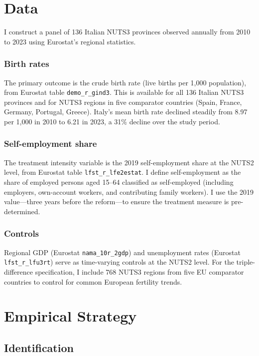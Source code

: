 \documentclass[12pt]{article}
\begin{document}
\section{Data}

I construct a panel of 136 Italian NUTS3 provinces observed annually from 2010 to 2023 using Eurostat's regional statistics.

\subsubsection*{Birth rates} The primary outcome is the crude birth rate (live births per 1,000 population), from Eurostat table \texttt{demo\_r\_gind3}. This is available for all 136 Italian NUTS3 provinces and for NUTS3 regions in five comparator countries (Spain, France, Germany, Portugal, Greece). Italy's mean birth rate declined steadily from 8.97 per 1,000 in 2010 to 6.21 in 2023, a 31\% decline over the study period.

\subsubsection*{Self-employment share} The treatment intensity variable is the 2019 self-employment share at the NUTS2 level, from Eurostat table \texttt{lfst\_r\_lfe2estat}. I define self-employment as the share of employed persons aged 15--64 classified as self-employed (including employers, own-account workers, and contributing family workers). I use the 2019 value---three years before the reform---to ensure the treatment measure is pre-determined.

\subsubsection*{Controls} Regional GDP (Eurostat \texttt{nama\_10r\_2gdp}) and unemployment rates (Eurostat \texttt{lfst\_r\_lfu3rt}) serve as time-varying controls at the NUTS2 level. For the triple-difference specification, I include 768 NUTS3 regions from five EU comparator countries to control for common European fertility trends.




\section{Empirical Strategy}

\subsection{Identification}
\end{document}
